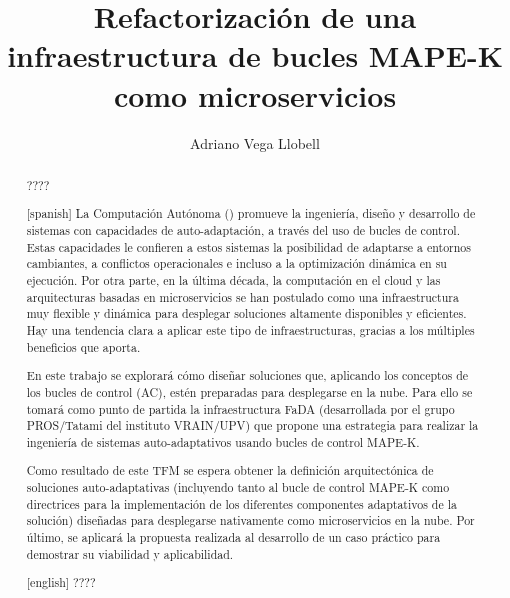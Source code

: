 \documentclass[11pt,spanish,listoffigures,listoftables,listlistings]{\relativepath/tfgetsinf}
\title{Refactorización de una infraestructura de bucles MAPE-K como microservicios}
\author{Adriano Vega Llobell}
\begin{document}



\begin{abstract}
????
\end{abstract}
\begin{abstract}[spanish]
  La Computación Autónoma () promueve la ingeniería, diseño y desarrollo de sistemas con capacidades de auto-adaptación, a través del uso de bucles de control. Estas capacidades le confieren a estos sistemas la posibilidad de adaptarse a entornos cambiantes, a conflictos operacionales e incluso a la optimización dinámica en su ejecución. Por otra parte, en la última década, la computación en el cloud y las arquitecturas basadas en microservicios se han postulado como una infraestructura muy flexible y dinámica para desplegar soluciones altamente disponibles y eficientes. Hay una tendencia clara a aplicar este tipo de infraestructuras, gracias a los múltiples beneficios que aporta.

  En este trabajo se explorará cómo diseñar soluciones que, aplicando los conceptos de los bucles de control (AC), estén preparadas para desplegarse en la nube. Para ello se tomará como punto de partida la infraestructura FaDA (desarrollada por el grupo PROS/Tatami del instituto VRAIN/UPV) que propone una estrategia para realizar la ingeniería de sistemas auto-adaptativos usando bucles de control MAPE-K.

  Como resultado de este TFM se espera obtener la definición arquitectónica de soluciones auto-adaptativas (incluyendo tanto al bucle de control MAPE-K como directrices para la implementación de los diferentes componentes adaptativos de la solución) diseñadas para desplegarse nativamente como microservicios en la nube. Por último, se aplicará la propuesta realizada al desarrollo de un caso práctico para demostrar su viabilidad y aplicabilidad.
\end{abstract}
\begin{abstract}[english]
????
\end{abstract}

\end{document}

